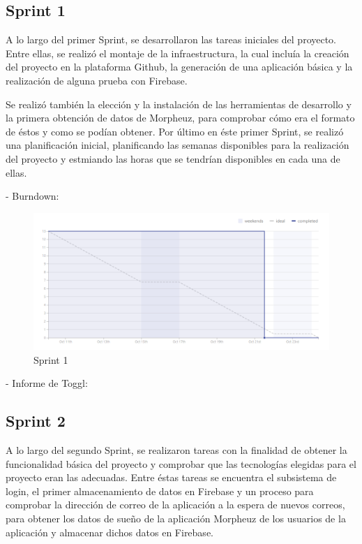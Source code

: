 \documentclass[11pt,openany]{book}
\begin{document}
\subsection{Sprint 1}

A lo largo del primer Sprint, se desarrollaron las tareas iniciales del proyecto. Entre ellas, se realizó el montaje de la infraestructura, la cual incluía la creación del proyecto en la plataforma Github, la generación de una aplicación básica y la realización de alguna prueba con Firebase.

Se realizó también la elección y la instalación de las herramientas de desarrollo y la primera obtención de datos de Morpheuz, para comprobar cómo era el formato de éstos y como se podían obtener. Por último en éste primer Sprint, se realizó una planificación inicial, planificando las semanas disponibles para la realización del proyecto y estmiando las horas que se tendrían disponibles en cada una de ellas.

- Burndown:

\begin{figure}[H]
\centering
\includegraphics[totalheight=7cm]{burndowns/Sprint1.png}
\caption{Sprint 1}
\end{figure}

- Informe de Toggl:



\subsection{Sprint 2}

A lo largo del segundo Sprint, se realizaron tareas con la finalidad de obtener la funcionalidad básica del proyecto y comprobar que las tecnologías elegidas para el proyecto eran las adecuadas. Entre éstas tareas se encuentra el subsistema de login, el primer almacenamiento de datos en Firebase y un proceso para comprobar la dirección de correo de la aplicación a la espera de nuevos correos, para obtener los datos de sueño de la aplicación Morpheuz de los usuarios de la aplicación y almacenar dichos datos en Firebase.
\end{document}
